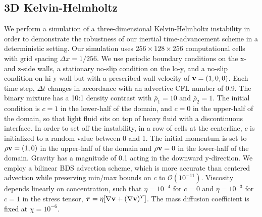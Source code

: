 \documentclass[final]{siamltex}
\def\vb {{\bf v}}
\def\taub   {\boldsymbol{\tau}}
\begin{document}
\subsection{3D Kelvin-Helmholtz}
We perform a simulation of a three-dimensional Kelvin-Helmholtz instability in order to demonstrate
the robustness of our inertial time-advancement scheme in a deterministic setting.
Our simulation uses $256\times 128\times 256$ computational cells with grid spacing
$\Delta x=1/256$.  We use periodic boundary conditions on the x- and z-side walls, a 
stationary no-slip condition on the lo-y, and a no-slip condition on hi-y wall
but with a prescribed wall velocity of $\vb=(1,0,0)$.
Each time step, $\Delta t$ changes in accordance with an
advective CFL number of 0.9.  The binary mixture has a 10:1 density contrast with
$\bar\rho_1=10$ and $\bar\rho_2=1$.  The initial condition is $c=1$ in the lower-half
of the domain, and $c=0$ in the upper-half of the domain, so that light fluid
sits on top of heavy fluid with a discontinuous interface.
In order to set off the instability, 
in a row of cells at the centerline, $c$ is initialized to a random value between 0 and 1.
The initial momentum is set to $\rho\vb=(1,0)$ in the upper-half of
the domain and $\rho\vb=0$ in the lower-half of the domain.
Gravity has a magnitude of 0.1 acting in the downward y-direction.
We employ a bilinear BDS advection scheme, which is more accurate than centered
advection while preserving min/max bounds on $c$ to $\mathcal O(10^{-11})$.
Viscosity depends linearly on concentration, such that $\eta=10^{-4}$ for $c=0$ 
and $\eta=10^{-3}$ for $c=1$ in the stress tensor,
$\taub = \eta[\nabla\vb + (\nabla\vb)^T]$.
The mass diffusion coefficient is fixed at $\chi=10^{-6}$.
\end{document}
